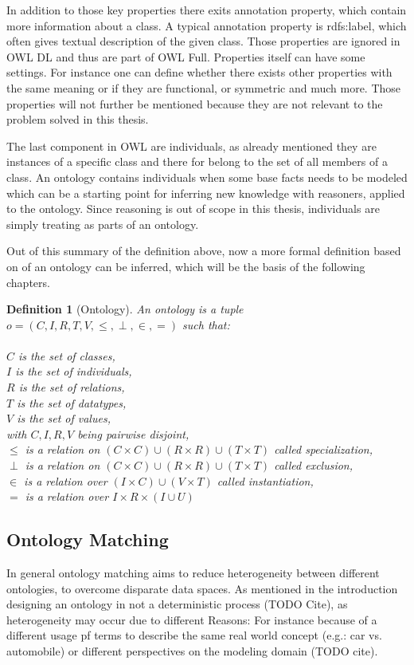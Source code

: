 \documentclass[11pt,titlepage,oneside,openany,a4paper]{report}
\newtheorem{definition}{Definition}[chapter]
\begin{document}
In addition to those key properties there exits annotation property, which contain more information about a class. A typical annotation property is rdfs:label, which often gives textual description of the given class. Those properties are ignored in OWL DL and thus are part of OWL Full. Properties itself can have some settings. For instance one can define whether there exists other properties with the same meaning or if they are functional, or symmetric and much more. Those properties will not further be mentioned because they are not relevant to the problem solved in this thesis.

The last component in OWL are individuals, as already mentioned they are instances of a specific class and there for belong to the set of all members of a class. An ontology contains individuals when some base facts needs to be modeled which can be a starting point for inferring new knowledge with reasoners, applied to the ontology. Since reasoning is out of scope in this thesis, individuals are simply treating as  parts of an ontology.

Out of this summary of the definition above, now a more formal definition based on \cite{euzenat2013d} of an ontology can be inferred, which will be the basis of the following chapters.
\begin{definition} [Ontology] An ontology is a tuple $ o = ( C,I,R,T,V,\leq,\perp,\in,=)$ such that:\\ \\
$C$ is the set of classes,\\
$I$ is the set of individuals,\\
$R$ is the set of relations,\\
$T$ is the set of datatypes, \\
$V$ is the set of values,\\
with $C,I,R,V$ being pairwise disjoint, \\
$\leq$ is a relation on  $ (C \times C)  \cup (R \times R) \cup (T \times T)$  called specialization,\\
$\perp$ is a relation on  $ (C \times C)  \cup (R \times R) \cup (T \times T)$ called exclusion,\\
$\in$ is a relation over $(I \times C) \cup (V \times T)$ called instantiation,\\
$=$ is a relation over $ I \times R \times (I \cup U)$
\end{definition}
\subsection{Ontology Matching}
\label{sec:ontologymatching_def}
In general ontology matching aims to reduce heterogeneity between different ontologies, to overcome disparate data spaces. As mentioned in the introduction designing an ontology in not a deterministic process (TODO Cite), as heterogeneity may occur due to different Reasons: For instance because of a different usage pf terms to describe the same real world concept (e.g.: car vs. automobile)  or different perspectives on the modeling domain (TODO cite). 
\end{document}
